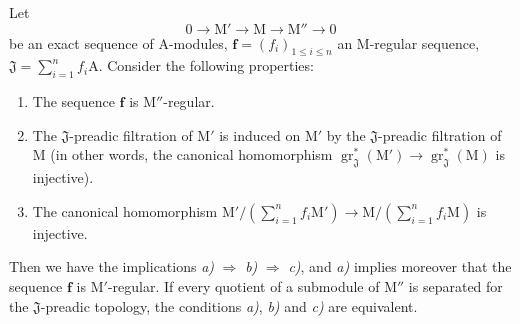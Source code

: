 \begin{proposition}[19.5.3]
\label{IV.19.5.3}
Let
\[
  0\to\mathrm{M}'\to\mathrm{M}\to\mathrm{M}''\to 0
\]
be an exact sequence of $\mathrm{A}$-modules, $\mathbf{f}=(f_i)_{1\leqslant i\leqslant n}$ an M-regular sequence, $\mathfrak{J}=\sum_{i=1}^{n}f_i\mathrm{A}$. Consider the following properties:
\begin{enumerate}
\item[\rm a)] The sequence $\mathbf{f}$ is $\mathrm{M}''$-regular.
\item[\rm b)] The $\mathfrak{J}$-preadic filtration of $\mathrm{M}'$ is induced on $\mathrm{M}'$ by the $\mathfrak{J}$-preadic filtration of $\mathrm{M}$ (in other words, the canonical homomorphism $\operatorname{gr}_\mathfrak{J}^*(\mathrm{M}')\to\operatorname{gr}_\mathfrak{J}^*(\mathrm{M})$ is injective).
\item[\rm c)] The canonical homomorphism $\mathrm{M}'/(\sum_{i=1}^{n}f_i\mathrm{M}')\to\mathrm{M}/(\sum_{i=1}^{n}f_i\mathrm{M})$ is injective.
\end{enumerate}
Then we have the implications \emph{a)} $\Rightarrow$ \emph{b)} $\Rightarrow$ \emph{c)}, and \emph{a)} implies moreover that the sequence $\mathbf{f}$ is $\mathrm{M}'$-regular.
If every quotient of a submodule of $\mathrm{M}''$ is separated for the $\mathfrak{J}$-preadic topology, the conditions \emph{a)}, \emph{b)} and \emph{c)} are equivalent.
\end{proposition}

